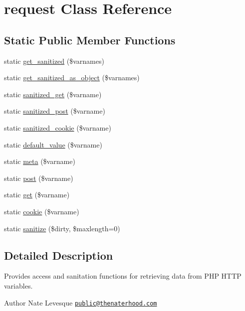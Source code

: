 \hypertarget{classrequest}{\section{request Class Reference}
\label{classrequest}
}
\subsection*{Static Public Member Functions}
\begin{DoxyCompactItemize}
\item 
static \hyperlink{classrequest_af5a8fd0735268d19657c87848b5827c4}{get\-\_\-sanitized} (\$varnames)
\item 
static \hyperlink{classrequest_abc216f18819cc535803c10177e6b89a6}{get\-\_\-sanitized\-\_\-as\-\_\-object} (\$varnames)
\item 
static \hyperlink{classrequest_a34d4adad12486829a5c14719a298797c}{sanitized\-\_\-get} (\$varname)
\item 
static \hyperlink{classrequest_a21f215aed587e3bfa86b3d2cf1f666f6}{sanitized\-\_\-post} (\$varname)
\item 
static \hyperlink{classrequest_a053c8d3b0c70d2d0f6db4810d9f0b3ba}{sanitized\-\_\-cookie} (\$varname)
\item 
static \hyperlink{classrequest_a37ee0eb6206a252716bc33cd4c0e7916}{default\-\_\-value} (\$varname)
\item 
static \hyperlink{classrequest_abac59171326160dc151ded6601f8da37}{meta} (\$varname)
\item 
static \hyperlink{classrequest_a544f6a832bdef9bd3857082da95887b6}{post} (\$varname)
\item 
static \hyperlink{classrequest_a322e929c6e065ccf688769109400b43b}{get} (\$varname)
\item 
static \hyperlink{classrequest_acb2ddb22763f6a73e2e5c4990edc277e}{cookie} (\$varname)
\item 
static \hyperlink{classrequest_aadbff81f737c00e5a9d634df19bc47cc}{sanitize} (\$dirty, \$maxlength=0)
\end{DoxyCompactItemize}


\subsection{Detailed Description}
Provides access and sanitation functions for retrieving data from P\-H\-P H\-T\-T\-P variables.

\begin{DoxyAuthor}{Author}
Nate Levesque \href{mailto:public@thenaterhood.com}{\tt public@thenaterhood.\-com} 
\end{DoxyAuthor}



